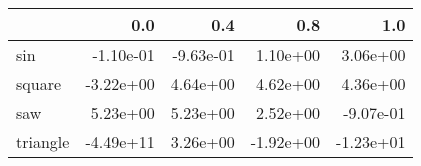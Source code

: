 \begin{tabular}{lrrrr}
\toprule
{} &       0.0 &       0.4 &       0.8 &       1.0 \\
\midrule
sin      & -1.10e-01 & -9.63e-01 &  1.10e+00 &  3.06e+00 \\
square   & -3.22e+00 &  4.64e+00 &  4.62e+00 &  4.36e+00 \\
saw      &  5.23e+00 &  5.23e+00 &  2.52e+00 & -9.07e-01 \\
triangle & -4.49e+11 &  3.26e+00 & -1.92e+00 & -1.23e+01 \\
\bottomrule
\end{tabular}
